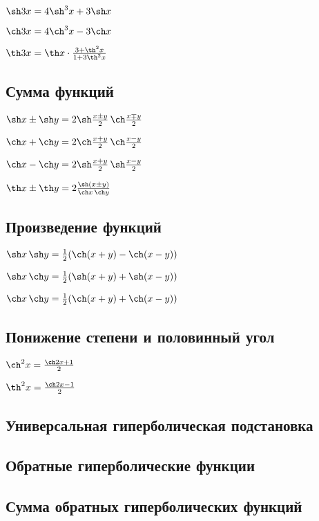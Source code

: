 $ \sh 3x = 4\sh^3 x + 3\sh x $

$ \ch 3x = 4\ch^3 x - 3\ch x $

$ \th 3x = \th x \cdot \frac{3+\th^2 x}{1 + 3\th^2 x} $

\subsection{Сумма функций}

$ \sh x \pm \sh y = 2\sh\frac{x\pm y}{2}\,\ch\frac{x\mp y}{2} $

$ \ch x + \ch y = 2\ch\frac{x+y}{2}\,\ch\frac{x-y}{2} $

$ \ch x - \ch y = 2\sh\frac{x+ y}{2}\,\sh\frac{x- y}{2} $

$ \th x \pm \th y = 2\frac{\sh(x\pm y)}{\ch x\, \ch y} $

\subsection{Произведение функций}

$ \sh x \, \sh y = \frac12(\ch(x+y)-\ch(x-y)) $

$ \sh x \, \ch y = \frac12(\sh(x+y)+\sh(x-y)) $

$ \ch x \, \ch y = \frac12(\ch(x+y)+\ch(x-y)) $

\subsection{Понижение степени и половинный угол}

$ \ch^2 x = \frac{\ch 2x+1}{2} $

$ \th^2 x = \frac{\ch 2x-1}{2} $ 

\subsection{Универсальная гиперболическая подстановка}



\subsection{Обратные гиперболические функции}

\subsection{Сумма обратных гиперболических функций}


